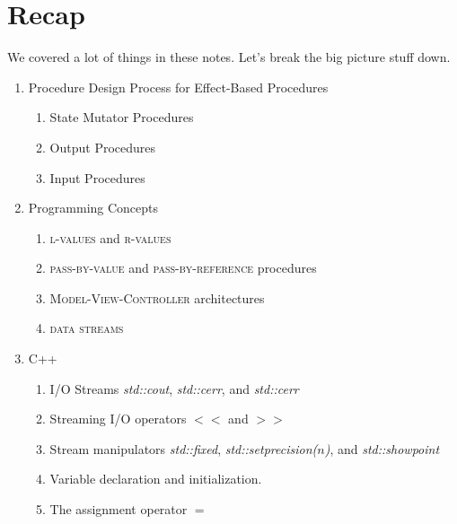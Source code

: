 \section{Recap}

We covered a lot of things in these notes. Let's break the big picture stuff down.
\begin{enumerate}
\item Procedure Design Process for Effect-Based Procedures
\begin{enumerate}
\item State Mutator Procedures
\item Output Procedures
\item Input Procedures
\end{enumerate}
\item Programming Concepts
\begin{enumerate}
\item \textsc{l-values} and \textsc{r-values}
\item \textsc{pass-by-value} and \textsc{pass-by-reference} procedures
\item \textsc{Model-View-Controller} architectures
\item \textsc{data streams}
\end{enumerate}
\item C++
\begin{enumerate}
\item I/O Streams \textit{std::cout}, \textit{std::cerr}, and \textit{std::cerr}
\item Streaming I/O operators $<<$  and $>>$
\item Stream manipulators \textit{std::fixed}, \textit{std::setprecision($n$)}, and \textit{std::showpoint}
\item Variable declaration and initialization.
\item The assignment operator $=$
\end{enumerate}
\end{enumerate}

